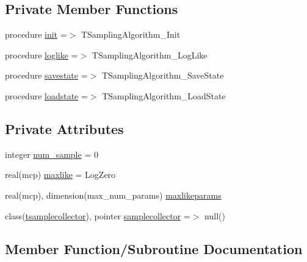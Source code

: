 \subsection*{Private Member Functions}
\begin{DoxyCompactItemize}
\item 
procedure \mbox{\hyperlink{structmontecarlo_1_1tsamplingalgorithm_ac6c103b3537eaad6741908150dd46321}{init}} =$>$ T\+Sampling\+Algorithm\+\_\+\+Init
\item 
procedure \mbox{\hyperlink{structmontecarlo_1_1tsamplingalgorithm_a4b1c92d1161474e6e8ca5cf0dde67c11}{loglike}} =$>$ T\+Sampling\+Algorithm\+\_\+\+Log\+Like
\item 
procedure \mbox{\hyperlink{structmontecarlo_1_1tsamplingalgorithm_afe41762da4a3e36c4e197c6ba86c65fb}{savestate}} =$>$ T\+Sampling\+Algorithm\+\_\+\+Save\+State
\item 
procedure \mbox{\hyperlink{structmontecarlo_1_1tsamplingalgorithm_a4843ab58d081ef761a400be3e8b9e086}{loadstate}} =$>$ T\+Sampling\+Algorithm\+\_\+\+Load\+State
\end{DoxyCompactItemize}
\subsection*{Private Attributes}
\begin{DoxyCompactItemize}
\item 
integer \mbox{\hyperlink{structmontecarlo_1_1tsamplingalgorithm_a410285b91a644097db3040f2ac41c615}{num\+\_\+sample}} = 0
\item 
real(mcp) \mbox{\hyperlink{structmontecarlo_1_1tsamplingalgorithm_af653bf55990bb2ddc0e47445c82e616b}{maxlike}} = Log\+Zero
\item 
real(mcp), dimension(max\+\_\+num\+\_\+params) \mbox{\hyperlink{structmontecarlo_1_1tsamplingalgorithm_a14476309a5a4286f22f485f7da16c6ee}{maxlikeparams}}
\item 
class(\mbox{\hyperlink{structmontecarlo_1_1tsamplecollector}{tsamplecollector}}), pointer \mbox{\hyperlink{structmontecarlo_1_1tsamplingalgorithm_a96a8462dc05a5e209fc5ef2bab8b892e}{samplecollector}} =$>$ null()
\end{DoxyCompactItemize}


\subsection{Member Function/\+Subroutine Documentation}
\mbox{\label{structmontecarlo_1_1tsamplingalgorithm_ac6c103b3537eaad6741908150dd46321}} 
